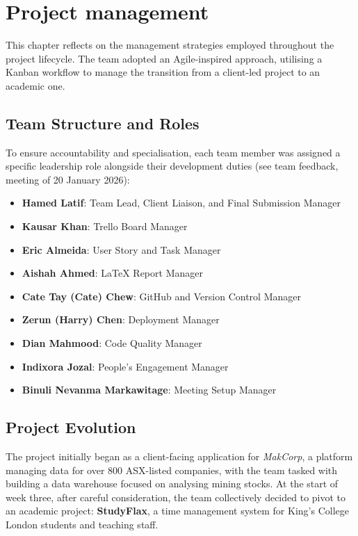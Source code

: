 \chapter{Project management}
\label{chap:project-management}

This chapter reflects on the management strategies employed throughout the project lifecycle.
The team adopted an Agile-inspired approach, utilising a Kanban workflow to manage the
transition from a client-led project to an academic one.

\section{Team Structure and Roles}

To ensure accountability and specialisation, each team member was assigned a specific
leadership role alongside their development duties
(see team feedback, meeting of 20 January 2026):
\begin{itemize}
    \item \textbf{Hamed Latif}: Team Lead, Client Liaison, and Final Submission Manager
    \item \textbf{Kausar Khan}: Trello Board Manager
    \item \textbf{Eric Almeida}: User Story and Task Manager
    \item \textbf{Aishah Ahmed}: LaTeX Report Manager
    \item \textbf{Cate Tay (Cate) Chew}: GitHub and Version Control Manager
    \item \textbf{Zerun (Harry) Chen}: Deployment Manager
    \item \textbf{Dian Mahmood}: Code Quality Manager
    \item \textbf{Indixora Jozal}: People's Engagement Manager
    \item \textbf{Binuli Nevanma Markawitage}: Meeting Setup Manager
\end{itemize}

\section{Project Evolution}

The project initially began as a client-facing application for \textit{MakCorp}, a platform
managing data for over 800 ASX-listed companies, with the team tasked with building a data
warehouse focused on analysing mining stocks. At the start of week three, after careful
consideration, the team collectively decided to pivot to an academic project: \textbf{StudyFlax},
a time management system for King's College London students and teaching staff.

